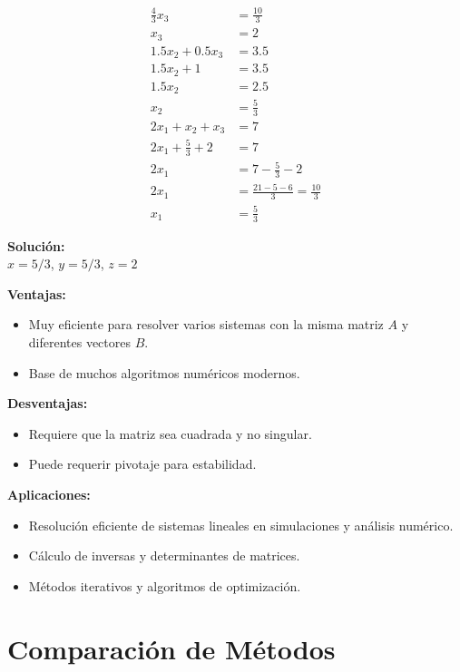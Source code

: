 \documentclass[12pt]{article}
\begin{document}
\begin{align*}
\frac{4}{3}x_3 &= \frac{10}{3} \\
x_3 &= 2 \\
1.5x_2 + 0.5x_3 &= 3.5 \\
1.5x_2 + 1 &= 3.5 \\
1.5x_2 &= 2.5 \\
x_2 &= \frac{5}{3} \\
2x_1 + x_2 + x_3 &= 7 \\
2x_1 + \frac{5}{3} + 2 &= 7 \\
2x_1 &= 7 - \frac{5}{3} - 2 \\
2x_1 &= \frac{21 - 5 - 6}{3} = \frac{10}{3} \\
x_1 &= \frac{5}{3}
\end{align*}

\textbf{Solución:}  \\
$x = 5/3$, $y = 5/3$, $z = 2$

\textbf{Ventajas:}
\begin{itemize}
    \item Muy eficiente para resolver varios sistemas con la misma matriz $A$ y diferentes vectores $B$.
    \item Base de muchos algoritmos numéricos modernos.
\end{itemize}

\textbf{Desventajas:}
\begin{itemize}
    \item Requiere que la matriz sea cuadrada y no singular.
    \item Puede requerir pivotaje para estabilidad.
\end{itemize}

\textbf{Aplicaciones:}
\begin{itemize}
    \item Resolución eficiente de sistemas lineales en simulaciones y análisis numérico.
    \item Cálculo de inversas y determinantes de matrices.
    \item Métodos iterativos y algoritmos de optimización.
\end{itemize}

\section{Comparación de Métodos}
\end{document}
